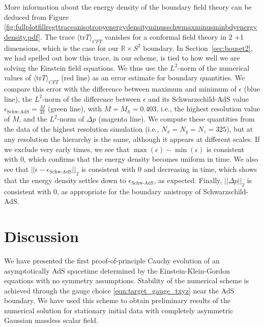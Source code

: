 \documentclass[a4paper,11pt]{article}
\numberwithin{equation}{section}
\begin{document}
More information about the energy density of the boundary field theory can be deduced from Figure \ref{fig:fullplotfillregttraceanisotropyenergydensityminusschwmaxminusminbdyenergydensity.pdf}. 
The trace $\langle \text{tr}T\rangle_{CFT}$ vanishes for a conformal field theory in 2 +1 dimensions, which is the case for our $\mathbb{R} \times S^2$ boundary.
In Section~\ref{sec:bouset2}, we had spelled out how this trace, in our scheme, is tied to how well we are solving the Einstein field equations.
We thus use the $L^2$-norm of the numerical values of $\langle \text{tr}T\rangle_{CFT}$ (red line) as an error estimate for boundary quantities. We compare this error with the difference between maximum and minimum of $\epsilon$ (blue line), the $L^2$-norm of the difference between $\epsilon$ and its Schwarzschild-AdS value $\epsilon_{\text{Schw-AdS}}=\frac{M}{4\pi}$ (green line), with $M=M_h=0.403$, i.e., the highest resolution value of $M$, and the $L^2$-norm of $\Delta p$ (magenta line). We compute these quantities from the data of the highest resolution simulation (i.e., $N_x=N_y=N_z=325$), but at any resolution the hierarchy is the same, although it appears at different scales.
If we exclude very early times, we see that $\max(\epsilon)-\min(\epsilon)$ is consistent with 0, which confirms that the energy density becomes uniform in time.
We also see that $||\epsilon-\epsilon_{\text{Schw-AdS}}||_2$ is consistent with 0 and decreasing in time, which shows that the energy density settles down to $\epsilon_{\text{Schw-AdS}}$, as expected.
Finally, $||\Delta p||_2$ is consistent with 0, as appropriate for the boundary anistropy of Schwarzschild-AdS.




\section{Discussion}\label{sec:Discussion}

We have presented the first proof-of-principle Cauchy evolution of an asymptotically AdS spacetime determined by the Einstein-Klein-Gordon equations with no symmetry assumptions. Stability of the numerical scheme is achieved through the gauge choice \eqref{eqn:target_gauge_txyz} near the AdS boundary. 
We have used this scheme to obtain preliminary results of the numerical solution for stationary initial data with completely asymmetric Gaussian massless scalar field.
\end{document}
